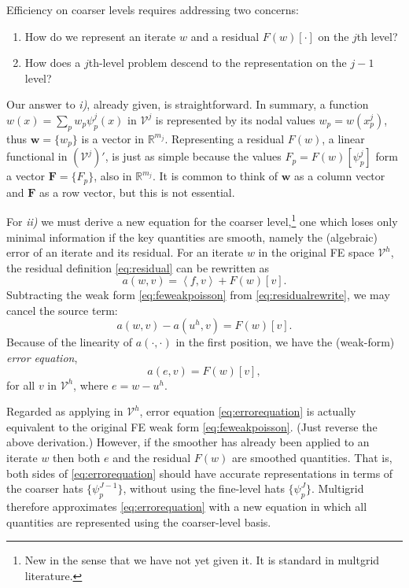 \documentclass[letterpaper,final,12pt,reqno]{amsart}
\theoremstyle{claim}
\newcommand{\RR}{\mathbb{R}}
\newcommand{\bw}{\mathbf{w}}
\newcommand{\bF}{\mathbf{F}}
\newcommand{\ip}[2]{\left<#1,#2\right>}
\numberwithin{equation}{section}
\numberwithin{figure}{section}
\numberwithin{table}{section}
\numberwithin{theorem}{section}
\begin{document}
Efficiency on coarser levels requires addressing two concerns:
\renewcommand{\labelenumi}{\emph{\roman{enumi})}}
\begin{enumerate}
\item How do we represent an iterate $w$ and a residual $F(w)[\cdot]$ on the $j$th level?
\item How does a $j$th-level problem descend to the representation on the $j-1$ level?
\end{enumerate}

Our answer to \emph{i)}, already given, is straightforward.  In summary, a function $w(x) = \sum_p w_p \psi_p^j(x)$ in $\mathcal{V}^j$ is represented by its nodal values $w_p=w(x_p^j)$, thus $\bw = \{w_p\}$ is a vector in $\RR^{m_j}$.  Representing a residual $F(w)$, a linear functional in $(\mathcal{V}^j)'$, is just as simple because the values $F_p = F(w)[\psi_p^j]$ form a vector $\bF=\{F_p\}$, also in $\RR^{m_j}$.  It is common to think of $\bw$ as a column vector and $\bF$ as a row vector, but this is not essential.

For \emph{ii)} we must derive a new equation for the coarser level,\footnote{New in the sense that we have not yet given it.  It is standard in multgrid literature.} one which loses only minimal information if the key quantities are smooth, namely the (algebraic) error of an iterate and its residual.  For an iterate $w$ in the original FE space $\mathcal{V}^h$, the residual definition \eqref{eq:residual} can be rewritten as
\begin{equation}
  a(w,v) = \ip{f}{v} + F(w)[v].  \label{eq:residualrewrite}
\end{equation}
Subtracting the weak form \eqref{eq:feweakpoisson} from \eqref{eq:residualrewrite}, we may cancel the source term:
\begin{equation}
  a(w,v) - a(u^h,v) = F(w)[v].  \label{eq:errorequationearly}
\end{equation}
Because of the linearity of $a(\cdot,\cdot)$ in the first position, we have the (weak-form) \emph{error equation},
\begin{equation}
  a(e,v) = F(w)[v],  \label{eq:errorequation}
\end{equation}
for all $v$ in $\mathcal{V}^h$, where $e=w-u^h$.

Regarded as applying in $\mathcal{V}^h$, error equation \eqref{eq:errorequation} is actually equivalent to the original FE weak form \eqref{eq:feweakpoisson}.  (Just reverse the above derivation.)  However, if the smoother has already been applied to an iterate $w$ then both $e$ and the residual $F(w)$ are smoothed quantities.  That is, both sides of \eqref{eq:errorequation} should have accurate representations in terms of the coarser hats $\{\psi_p^{J-1}\}$, without using the fine-level hats $\{\psi_p^{J}\}$.  Multigrid therefore approximates \eqref{eq:errorequation} with a new equation in which all quantities are represented using the coarser-level basis.
\end{document}
